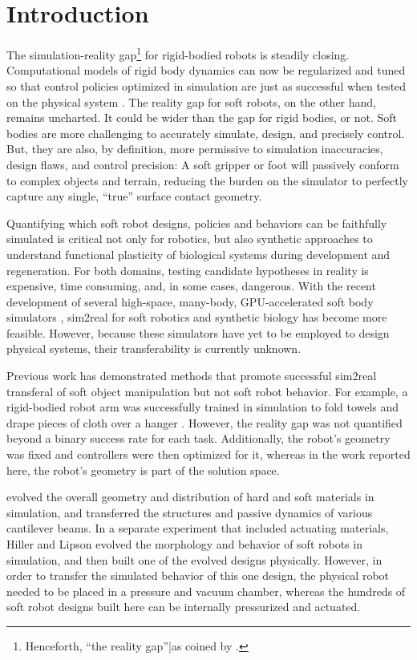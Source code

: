\section{Introduction}
\label{sec:intro}

The simulation-reality gap\footnote{Henceforth, ``the reality gap''|as coined by \citet{jakobi1995noise}.} for rigid-bodied robots is steadily closing.
Computational models of rigid body dynamics can now be regularized and tuned so that control policies optimized in simulation are just as successful when tested on the physical system \cite{bongard2006resilient,hwangbo2019learning}.
The reality gap for soft robots, on the other hand, remains uncharted.
It could be wider than the gap for rigid bodies, or not.
Soft bodies are more challenging to accurately simulate, design, and precisely control.
But, they are also, by definition, more permissive to simulation inaccuracies, design flaws, and control precision: 	
A soft gripper or foot will passively conform to complex objects and terrain, reducing the burden on the simulator to perfectly capture any single, ``true'' surface contact geometry.

Quantifying which soft robot designs, policies and behaviors can be faithfully simulated is critical not only for robotics, but also synthetic approaches to understand functional plasticity of biological systems during development and regeneration.
For both domains, testing candidate hypotheses in reality is expensive, time consuming, and, in some cases, dangerous.
With the recent development of several high-space, many-body, GPU-accelerated 
soft body simulators \cite{holden2019subspace,macklin2019non},
sim2real for soft robotics and synthetic biology has become more feasible.
However, because these simulators have yet to be employed to design physical systems, their transferability is currently unknown.

Previous work has demonstrated methods that promote successful sim2real transferal of soft object manipulation but not soft robot behavior.
For example, a rigid-bodied robot arm was successfully trained in simulation to fold towels and drape pieces of cloth over a hanger \cite{matas2018sim}.
However, the reality gap was not quantified beyond a binary success rate for each task.
Additionally, the robot's geometry was fixed and controllers were then optimized for it, whereas in the work reported here, the robot's geometry is part of the solution space.

\citet{hiller2011automatic} evolved the overall geometry and distribution of hard and soft materials in simulation, and transferred the structures and passive dynamics of various cantilever beams.
In a separate experiment that included actuating materials, Hiller and Lipson evolved the morphology and behavior of soft robots in simulation, and then built one of the evolved designs physically. 
However, in order to transfer the simulated behavior of this one design, the physical robot needed to be placed in a pressure and vacuum chamber,
whereas the hundreds of soft robot designs built here can be internally pressurized and actuated.

